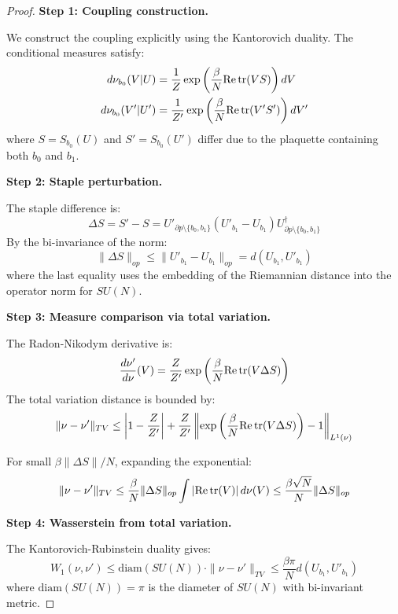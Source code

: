 \begin{proof}
\textbf{Step 1: Coupling construction.}

We construct the coupling explicitly using the Kantorovich duality. The conditional measures satisfy:
\begin{align}
    d\nu_{b_0}(V | U) &= \frac{1}{Z} \exp\left( \frac{\beta}{N} \text{Re\,tr}(V S) \right) dV \\
    d\nu_{b_0}(V' | U') &= \frac{1}{Z'} \exp\left( \frac{\beta}{N} \text{Re\,tr}(V' S') \right) dV'
\end{align}
where $S = S_{b_0}(U)$ and $S' = S_{b_0}(U')$ differ due to the plaquette containing both $b_0$ and $b_1$.

\textbf{Step 2: Staple perturbation.}

The staple difference is:
\begin{equation}
    \Delta S = S' - S = U'_{\partial p \setminus \{b_0, b_1\}} (U'_{b_1} - U_{b_1}) U_{\partial p \setminus \{b_0, b_1\}}^\dagger
\end{equation}
By the bi-invariance of the norm:
\begin{equation}
    \|\Delta S\|_{op} \leq \|U'_{b_1} - U_{b_1}\|_{op} = d(U_{b_1}, U'_{b_1})
\end{equation}
where the last equality uses the embedding of the Riemannian distance into the operator norm for $SU(N)$.

\textbf{Step 3: Measure comparison via total variation.}

The Radon-Nikodym derivative is:
\begin{equation}
    \frac{d\nu'}{d\nu}(V) = \frac{Z}{Z'} \exp\left( \frac{\beta}{N} \text{Re\,tr}(V \Delta S) \right)
\end{equation}
The total variation distance is bounded by:
\begin{equation}
    \|\nu - \nu'\|_{TV} \leq \left| 1 - \frac{Z}{Z'} \right| + \frac{Z}{Z'} \left\| \exp\left( \frac{\beta}{N} \text{Re\,tr}(V \Delta S) \right) - 1 \right\|_{L^1(\nu)}
\end{equation}

For small $\beta \|\Delta S\| / N$, expanding the exponential:
\begin{equation}
    \|\nu - \nu'\|_{TV} \leq \frac{\beta}{N} \|\Delta S\|_{op} \int |\text{Re\,tr}(V)| \, d\nu(V) \leq \frac{\beta \sqrt{N}}{N} \|\Delta S\|_{op}
\end{equation}

\textbf{Step 4: Wasserstein from total variation.}

The Kantorovich-Rubinstein duality gives:
\begin{equation}
    W_1(\nu, \nu') \leq \text{diam}(SU(N)) \cdot \|\nu - \nu'\|_{TV} \leq \frac{\beta \pi}{N} d(U_{b_1}, U'_{b_1})
\end{equation}
where $\text{diam}(SU(N)) = \pi$ is the diameter of $SU(N)$ with bi-invariant metric.
\end{proof}

